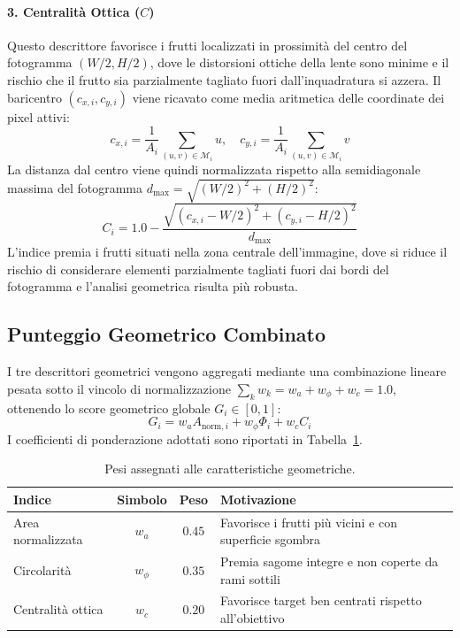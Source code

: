 \paragraph{3. Centralità Ottica ($C$)}
Questo descrittore favorisce i frutti localizzati in prossimità del centro del fotogramma $(W/2, H/2)$, dove le distorsioni ottiche della lente sono minime e il rischio che il frutto sia parzialmente tagliato fuori dall'inquadratura si azzera. Il baricentro $(c_{x, i}, c_{y, i})$ viene ricavato come media aritmetica delle coordinate dei pixel attivi:
\begin{equation}
    c_{x, i} = \frac{1}{A_i} \sum_{(u, v) \in \mathcal{M}_i} u, \quad c_{y, i} = \frac{1}{A_i} \sum_{(u, v) \in \mathcal{M}_i} v
    \label{eq:centroide}
\end{equation}
La distanza dal centro viene quindi normalizzata rispetto alla semidiagonale massima del fotogramma $d_{\max} = \sqrt{(W/2)^2 + (H/2)^2}$:
\begin{equation}
    C_i = 1.0 - \frac{\sqrt{(c_{x, i} - W/2)^2 + (c_{y, i} - H/2)^2}}{d_{\max}}
    \label{eq:centralita}
\end{equation}
L'indice premia i frutti situati nella zona centrale dell'immagine, dove si riduce il rischio di considerare elementi parzialmente tagliati fuori dai bordi del fotogramma e l'analisi geometrica risulta più robusta.

\subsection{Punteggio Geometrico Combinato}
\label{subsec:score_combinato}

I tre descrittori geometrici vengono aggregati mediante una combinazione lineare pesata sotto il vincolo di normalizzazione $\sum_k w_k = w_a + w_\phi + w_c = 1.0$, ottenendo lo score geometrico globale $G_i \in [0, 1]$:
\begin{equation}
    G_i = w_a A_{\text{norm}, i} + w_\phi \Phi_i + w_c C_i
    \label{eq:score_geometrico}
\end{equation}
I coefficienti di ponderazione adottati sono riportati in Tabella~\ref{tab:pesi_geometrici}.

\begin{table}[htbp]
    \centering
    \caption{Pesi assegnati alle caratteristiche geometriche.}
    \label{tab:pesi_geometrici}
    \begin{tabular}{lcc p{7.0cm}}
        \toprule
        \textbf{Indice} & \textbf{Simbolo} & \textbf{Peso} & \textbf{Motivazione} \\
        \midrule
        Area normalizzata   & $w_a$           & $0.45$        & Favorisce i frutti più vicini e con superficie sgombra \\
        Circolarità         & $w_\phi$        & $0.35$        & Premia sagome integre e non coperte da rami sottili \\
        Centralità ottica   & $w_c$           & $0.20$        & Favorisce target ben centrati rispetto all'obiettivo \\
        \bottomrule
    \end{tabular}
\end{table}

